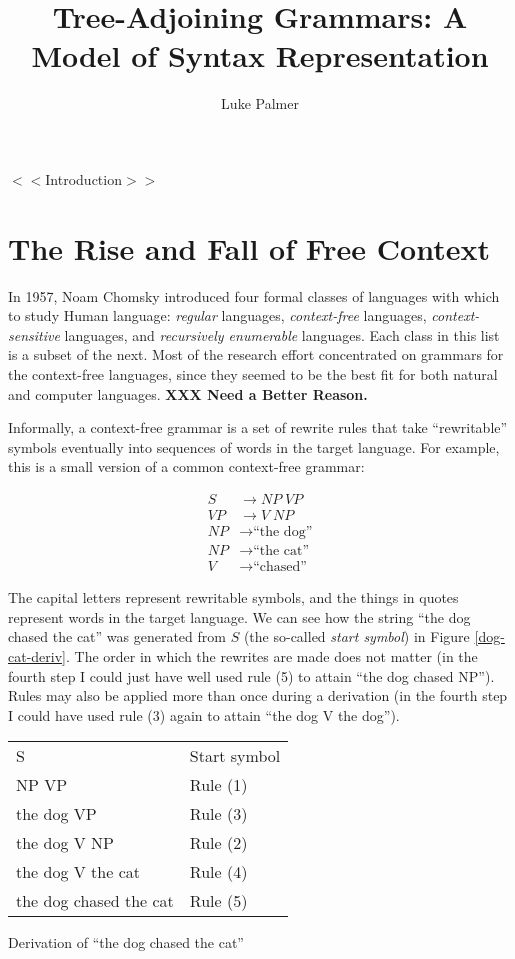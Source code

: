 \documentclass[12pt]{article}
\title{Tree-Adjoining Grammars: A Model of Syntax Representation}
\author{Luke Palmer}
\newcommand{\defn}[1]{\textit{#1}}
\newcommand{\XXX}[1]{\textbf{XXX #1}}
\begin{document}
\maketitle
\doublespace

$<<$Introduction$>>$

\section{The Rise and Fall of Free Context}
\label{sec-free-context}

In 1957, Noam Chomsky introduced four formal classes of languages with
which to study Human language:  \defn{regular} languages,
\defn{context-free} languages, \defn{context-sensitive} languages,
and \defn{recursively enumerable} languages.  Each class in this list
is a subset of the next.  Most of the research effort concentrated on
grammars for the context-free languages, since they seemed to be the
best fit for both natural and computer languages. \XXX{Need a
Better Reason.}

Informally, a context-free grammar is a set of rewrite rules that take
``rewritable'' symbols eventually into sequences of words in the target
language.  For example, this is a small version of a common context-free
grammar:

\begin{align}
S  &\rightarrow \mathit{NP} \; \mathit{VP}      \tag{1} \\
\mathit{VP} &\rightarrow V \; \mathit{NP}       \tag{2} \\
\mathit{NP} &\rightarrow \text{``the dog''}     \tag{3} \\
\mathit{NP} &\rightarrow \text{``the cat''}     \tag{4} \\
V  &\rightarrow \text{``chased''}               \tag{5}
\end{align}

The capital letters represent rewritable symbols, and the things in
quotes represent words in the target language.  We can see how the
string ``the dog chased the cat'' was generated from $S$ (the so-called
\defn{start symbol}) in Figure \ref{dog-cat-deriv}.  The order in
which the rewrites are made does not matter (in the fourth step I could
just have well used rule (5) to attain ``the dog chased NP'').  Rules may
also be applied more than once during a derivation (in the fourth step I
could have used rule (3) again to attain ``the dog V the dog'').

\begin{Figure}
\begin{tabularx}{\linewidth}{X|X}
S                      & Start symbol \\
NP VP                  & Rule (1) \\
the dog VP             & Rule (3) \\
the dog V NP           & Rule (2) \\
the dog V the cat      & Rule (4) \\
the dog chased the cat & Rule (5) \\
\end{tabularx}
\caption{Derivation of ``the dog chased the cat''}
\label{dog-cat-deriv}
\end{Figure}
\end{document}
